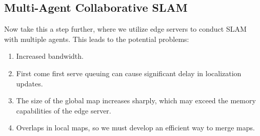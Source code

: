 \documentclass{article}
\theoremstyle{definition}
\theoremstyle{remark}
\theoremstyle{definition}
\begin{document}
\subsection{Multi-Agent Collaborative SLAM}

Now take this a step further, where we utilize edge servers to conduct SLAM with multiple agents. This leads to the potential problems: 
\begin{enumerate}
    \item Increased bandwidth. 
    \item First come first serve queuing can cause significant delay in localization updates. 
    \item The size of the global map increases sharply, which may exceed the memory capabilities of the edge server. 
    \item Overlaps in local maps, so we must develop an efficient way to merge maps. 
\end{enumerate}
\end{document}

